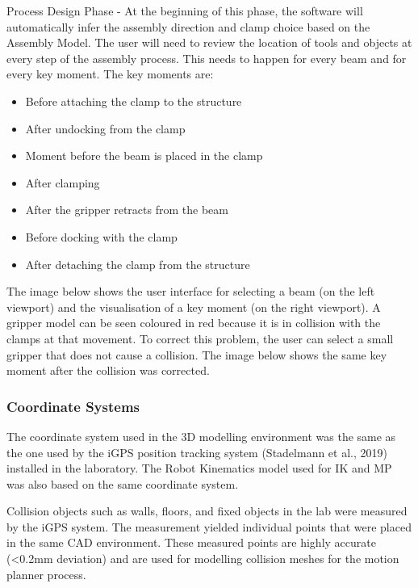 \begin{itemize}
\begin{enumerate}
Process Design Phase - At the beginning of this phase, the software will automatically infer the assembly direction and clamp choice based on the Assembly Model. 
The user will need to review the location of tools and objects at every step of the assembly process. This needs to happen for every beam and for every key moment. The key moments are:
\begin{itemize}
\item Before attaching the clamp to the structure
\item After undocking from the clamp
\item Moment before the beam is placed in the clamp
\item After clamping
\item After the gripper retracts from the beam
\item Before docking with the clamp
\item After detaching the clamp from the structure
\end{itemize}

The image below shows the user interface for selecting a beam (on the left viewport) and the visualisation of a key moment (on the right viewport). A gripper model can be seen coloured in red because it is in collision with the clamps at that movement. 
To correct this problem, the user can select a small gripper that does not cause a collision. The image below shows the same key moment after the collision was corrected.

\subsubsection{Coordinate Systems}

The coordinate system used in the 3D modelling environment was the same as the one used by the iGPS position tracking system (Stadelmann et al., 2019) installed in the laboratory. The Robot Kinematics model used for IK and MP was also based on the same coordinate system. 

Collision objects such as walls, floors, and fixed objects in the lab were measured by the iGPS system. The measurement yielded individual points that were placed in the same CAD environment. These measured points are highly accurate (<0.2mm deviation) and are used for modelling collision meshes for the motion planner process.


\end{enumerate}
\end{itemize}
